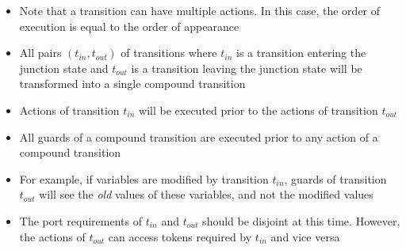 \begin{frame}[fragile=singleslide]
\begin{itemize}
\item Note that a transition can have multiple actions. In this case, the order of
      execution is equal to the order of appearance
\item All pairs $(t_{in},t_{out})$ of transitions where $t_{in}$ is a transition entering the junction state
      and $t_{out}$ is a transition leaving the junction state will be transformed into a single compound transition
\item Actions of transition $t_{in}$ will be executed prior to the actions of transition $t_{out}$
\item All guards of a compound transition are executed prior to any action of a compound transition
\item For example, if variables are modified by transition $t_{in}$, guards of transition $t_{out}$ 
      will see the \emph{old} values of these variables, and not the modified values
\item The port requirements of $t_{in}$ and $t_{out}$ should be disjoint at this time. However,
      the actions of $t_{out}$ can access tokens required by $t_{in}$ and vice versa
\end{itemize}
\end{frame}

